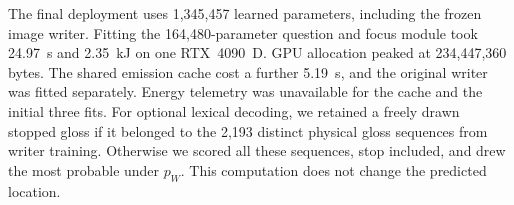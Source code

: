 The final deployment uses 1,345,457 learned parameters, including the frozen image writer. Fitting the 164,480-parameter question and focus module took 24.97~s and 2.35~kJ on one RTX~4090~D. GPU allocation peaked at 234,447,360 bytes. The shared emission cache cost a further 5.19~s, and the original writer was fitted separately. Energy telemetry was unavailable for the cache and the initial three fits. For optional lexical decoding, we retained a freely drawn stopped gloss if it belonged to the 2,193 distinct physical gloss sequences from writer training. Otherwise we scored all these sequences, stop included, and drew the most probable under $p_W$. This computation does not change the predicted location.
